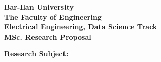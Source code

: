 \begin{titlepage}







    \begin{center}


        \vspace*{2\bigskipamount}


        {\makeatletter
            \titlestyle\bfseries\LARGE Bar-Ilan University \\
            The Faculty of Engineering \\
            \bigskip
            Electrical Engineering, Data Science Track \\
            \bigskip
            MSc. Research Proposal
            \makeatother}
        \bigskip
        \bigskip
        \bigskip

    \end{center} 
      \textbf{Research Subject:} 
     \begin{center}
         
        
        \bigskip
        {\makeatletter
            \titlestyle\bfseries\LARGE 
            \@title
            \makeatother}

        {\makeatletter
            \ifx\@subtitle\undefined\else
                \bigskip
                \titlefont\titleshape\Large\@subtitle
            \fi
            \makeatother}

        \vfill


\end{center}
\end{titlepage}
